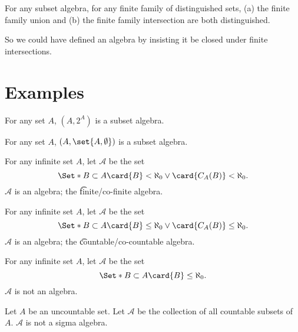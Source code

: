 \begin{proposition}
For any subset algebra,
for any finite family of distinguished sets,
(a) the finite family union and
(b) the finite family intersection
are both distinguished.
\end{proposition}

So we could have defined an algebra
by insisting it be closed under finite
intersections.

\section*{Examples}

\begin{example}
For any set $A$, $(A, 2^{A})$ is a subset algebra.
\end{example}

\begin{example}
For any set $A$, $(A, \set{A, \emptyset})$ is a subset algebra.
\end{example}

\begin{example}
For any infinite set $A$, let $\mathcal{A} $ be the set
\[
\Set*{
B \subset A
}{
\card{B} < \aleph_0 \lor
\card{C_{A}(B)} < \aleph_0
}.
\]
$\mathcal{A} $ is an algebra;
the
\t{finite/co-finite algebra}.
\end{example}

\begin{example}
For any infinite set $A$, let $\mathcal{A} $ be the set
\[
\Set*{
B \subset A
}{
\card{B} \leq \aleph_0 \lor
\card{C_{A}(B)} \leq \aleph_0
}.
\]
$\mathcal{A} $ is an algebra; the \t{countable/co-countable algebra}.
\end{example}

\begin{example}
For any infinite set $A$, let $\mathcal{A} $ be the set
\[
\Set*{
B \subset A
}{
\card{B} \leq \aleph_0
}.
\]
$\mathcal{A} $ is not an algebra.
\end{example}

\begin{example}
Let $A$ be an uncountable set.
Let $\mathcal{A} $ be the collection of all countable subsets of $A$.
$\mathcal{A} $ is not a sigma algebra.
\end{example}

